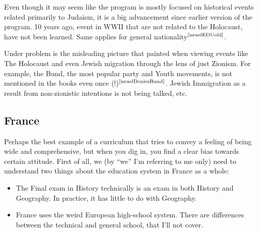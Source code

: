 \documentclass[12pt]{../../../tex/classes/styledArticle}
\newcommand\mc[1]  {$^{\text{\cite{#1}}}$}
\begin{document}
	Even though it may seem like the program is mostly focused on historical events related primarily to Judaism, it is a big advancement since earlier version of the program. 10 years ago, event in WWII that are not related to the Holocaust, have not been learned. Same applies for general nationality\mc{israelEDUold}. 
	
	Under problem is the misleading picture that painted when viewing events like The Holocaust and even Jewish migration through the lens of just Zionism. For example, the Bund, the most popular party and Youth movements, is not mentioned in the books even once (!)\mc{israelDeniesBund}. Jewish Immigration as a result from non-zionistic intentions is not being talked, etc. 
	
	
	
	
	
	\subsection{France}
	Perhaps the best example of a curriculum that tries to convey a feeling of being wide and comprehensive, but when you dig in, you find a clear bias towards certain attitude. First of all, we (by ``we'' I'm referring to me only) need to understand two things about the education system in France as a whole: 
	\begin{itemize}
		\item The Final exam in History technically is an exam in both History and Geography. In practice, it has little to do with Geography. 
		\item France uses the weird European high-school system. There are differences between the technical and general school, that I'll not cover. 
	\end{itemize}
	
\end{document}
